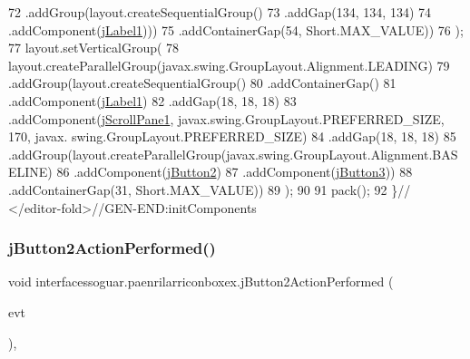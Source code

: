 \begin{DoxyCode}
72                     .addGroup(layout.createSequentialGroup()
73                         .addGap(134, 134, 134)
74                         .addComponent(\mbox{\hyperlink{classinterfacessoguar_1_1paenrilarriconboxex_a183fb515416e9f28b873f438feb9bd96}{jLabel1}})))
75                 .addContainerGap(54, Short.MAX\_VALUE))
76         );
77         layout.setVerticalGroup(
78             layout.createParallelGroup(javax.swing.GroupLayout.Alignment.LEADING)
79             .addGroup(layout.createSequentialGroup()
80                 .addContainerGap()
81                 .addComponent(\mbox{\hyperlink{classinterfacessoguar_1_1paenrilarriconboxex_a183fb515416e9f28b873f438feb9bd96}{jLabel1}})
82                 .addGap(18, 18, 18)
83                 .addComponent(\mbox{\hyperlink{classinterfacessoguar_1_1paenrilarriconboxex_a37efb18a476b6d2b02f2181ef12a7bf7}{jScrollPane1}}, javax.swing.GroupLayout.PREFERRED\_SIZE, 170, javax.
      swing.GroupLayout.PREFERRED\_SIZE)
84                 .addGap(18, 18, 18)
85                 .addGroup(layout.createParallelGroup(javax.swing.GroupLayout.Alignment.BASELINE)
86                     .addComponent(\mbox{\hyperlink{classinterfacessoguar_1_1paenrilarriconboxex_ada9e272c25f98b59277bf1cc3d87e89d}{jButton2}})
87                     .addComponent(\mbox{\hyperlink{classinterfacessoguar_1_1paenrilarriconboxex_ab9e110160eea74109e1ac28fcf342a44}{jButton3}}))
88                 .addContainerGap(31, Short.MAX\_VALUE))
89         );
90 
91         pack();
92     \}\textcolor{comment}{// </editor-fold>//GEN-END:initComponents}
\end{DoxyCode}
\mbox{\label{classinterfacessoguar_1_1paenrilarriconboxex_ad3d3c77ffada02753ef8c9de4432c0ad}} 
\subsubsection{\texorpdfstring{j\+Button2\+Action\+Performed()}{jButton2ActionPerformed()}}
{\footnotesize\ttfamily void interfacessoguar.\+paenrilarriconboxex.\+j\+Button2\+Action\+Performed (\begin{DoxyParamCaption}\item[{java.\+awt.\+event.\+Action\+Event}]{evt }\end{DoxyParamCaption})\hspace{0.3cm}{\ttfamily [inline]}, {\ttfamily [private]}}


